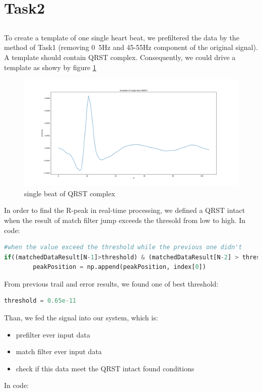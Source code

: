 \documentclass[a4paper,12pt]{article}
\begin{document}
\section{Task2}
\subsection{}
To create a template of one single heart beat, we prefiltered the data by the method of Task1 (removing 0~5Hz and 45-55Hz component of the original signal). A template should contain QRST complex. Consequently, we could drive a template as showy by figure \ref{fig_matchCore}
\begin{figure}[H]   
	\centering 
	\includegraphics[width=12cm]{../Figures/matchCore.pdf} 
	\caption{single beat of QRST complex}   
	\label{fig_matchCore}
\end{figure}
In order to find the R-peak in real-time processing, we defined a QRST intact when the result of match filter jump exceeds the thresold from low to high.  In code:
\begin{lstlisting}[language=Python]
#when the value exceed the threshold while the previous one didn't
if((matchedDataResult[N-1]>threshold) & (matchedDataResult[N-2] > threshold)):
		peakPosition = np.append(peakPosition, index[0])
\end{lstlisting}
From previous trail and error results, we found one of best threshold:
\begin{lstlisting}[language=Python]
threshold = 0.65e-11
\end{lstlisting}
Than, we fed the signal into our system, which is:
\begin{itemize}
	\item prefilter ever input data
	\item match filter ever input data
	\item check if this data meet the QRST intact found conditions
\end{itemize}
In code:
\end{document}
